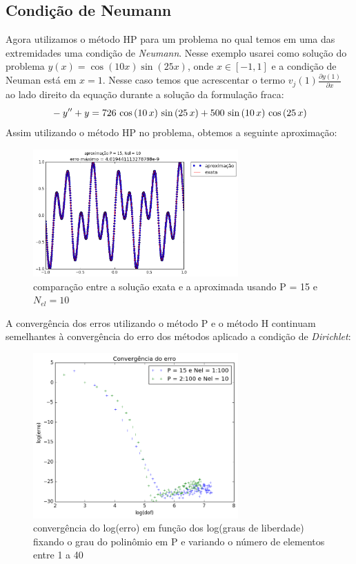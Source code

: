 \subsection{Condição de Neumann}
 Agora utilizamos o método HP para um problema no qual temos em uma das extremidades uma condição de \emph{Neumann}. Nesse exemplo usarei como solução do problema $y(x) = \cos(10 x) \sin(25 x)$, onde $ x \in [-1,1]$ e a condição de Neuman está em $x=1$. Nesse caso temos que acrescentar o termo  $v_j(1) \frac{\partial y(1)}{\partial x}$  ao lado direito da equação durante a solução da formulação fraca:
\begin{equation}
\\-y'' + y = 726\,\cos \left(10\,x\right)\,\sin \left(25\,x\right)+500\,\sin 
 \left(10\,x\right)\,\cos \left(25\,x\right) 
\end{equation}
 Assim utilizando o método HP no problema, obtemos a seguinte aproximação:
\begin{figure}[H]
\centering
\includegraphics[width=0.7\textwidth,center]{figuras/Neumm_10_15.png}
\caption{comparação entre a solução exata e a aproximada usando P = 15 e $N_{el} = 10$ } 
\end{figure}
A convergência dos erros utilizando o método P e o método H continuam semelhantes à convergência do erro dos métodos aplicado a condição de \emph{Dirichlet}:
\begin{figure}[H]
\centering
\includegraphics[width=0.7\textwidth,center]{figuras/convergencia_erro_Neumm.png}
\caption{convergência do log(erro) em função dos log(graus de liberdade) fixando o grau do polinômio em P e variando o número de elementos entre 1 a 40 } 
\end{figure}
